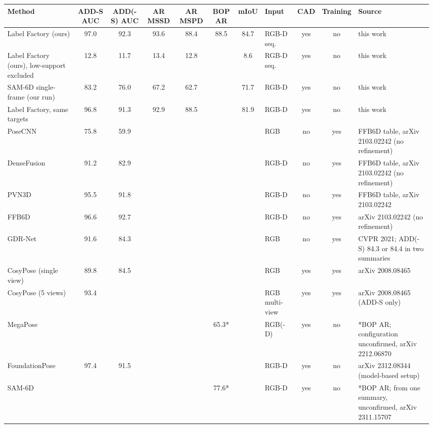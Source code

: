 \begin{tabular}{lcccccclccl}
\hline
Method & ADD-S AUC & ADD(-S) AUC & AR MSSD & AR MSPD & BOP AR & mIoU & Input & CAD & Training & Source \\
\hline
Label Factory (ours) & 97.0 & 92.3 & 93.6 & 88.4 & 88.5 & 84.7 & RGB-D seq. & yes & no & this work \\
Label Factory (ours), low-support excluded & 12.8 & 11.7 & 13.4 & 12.8 &  & 8.6 & RGB-D seq. & yes & no & this work \\
SAM-6D single-frame (our run) & 83.2 & 76.0 & 67.2 & 62.7 &  & 71.7 & RGB-D & yes & no & this work \\
Label Factory, same targets & 96.8 & 91.3 & 92.9 & 88.5 &  & 81.9 & RGB-D & yes & no & this work \\
PoseCNN & 75.8 & 59.9 &  &  &  &  & RGB & no & yes & FFB6D table, arXiv 2103.02242 (no refinement) \\
DenseFusion & 91.2 & 82.9 &  &  &  &  & RGB-D & no & yes & FFB6D table, arXiv 2103.02242 (no refinement) \\
PVN3D & 95.5 & 91.8 &  &  &  &  & RGB-D & no & yes & FFB6D table, arXiv 2103.02242 \\
FFB6D & 96.6 & 92.7 &  &  &  &  & RGB-D & no & yes & arXiv 2103.02242 (no refinement) \\
GDR-Net & 91.6 & 84.3 &  &  &  &  & RGB & no & yes & CVPR 2021; ADD(-S) 84.3 or 84.4 in two summaries \\
CosyPose (single view) & 89.8 & 84.5 &  &  &  &  & RGB & yes & yes & arXiv 2008.08465 \\
CosyPose (5 views) & 93.4 &  &  &  &  &  & RGB multi-view & yes & yes & arXiv 2008.08465 (ADD-S only) \\
MegaPose &  &  &  &  & 65.3* &  & RGB(-D) & yes & no & *BOP AR; configuration unconfirmed, arXiv 2212.06870 \\
FoundationPose & 97.4 & 91.5 &  &  &  &  & RGB-D & yes & no & arXiv 2312.08344 (model-based setup) \\
SAM-6D &  &  &  &  & 77.6* &  & RGB-D & yes & no & *BOP AR; from one summary, unconfirmed, arXiv 2311.15707 \\
\hline
\end{tabular}
